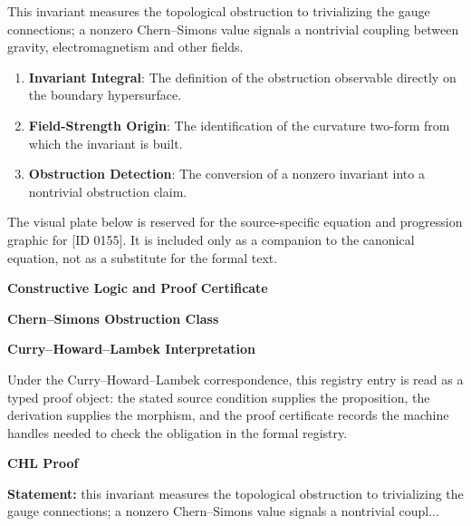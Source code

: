 This invariant measures the topological obstruction to trivializing the gauge connections; a nonzero Chern--Simons value signals a nontrivial coupling between gravity, electromagnetism and other fields.
\endgroup

\begin{enumerate}[leftmargin=1.6em,itemsep=6pt,topsep=4pt]
\item \textbf{Invariant Integral}: The definition of the obstruction observable directly on the boundary hypersurface.
\item \textbf{Field-Strength Origin}: The identification of the curvature two-form from which the invariant is built.
\item \textbf{Obstruction Detection}: The conversion of a nonzero invariant into a nontrivial obstruction claim.
\end{enumerate}

\begingroup\footnotesize\sloppy
The visual plate below is reserved for the source-specific equation and progression graphic for [ID 0155]. It is included only as a companion to the canonical equation, not as a substitute for the formal text.
\par\endgroup
\ifTZPDarkEdition
{}
\fi

\clearpage
\begingroup\tzpsupportsetup
\noindent\textbf{\fontsize{10.8pt}{12.8pt}\selectfont [ID 0155] Constructive Logic and Proof Certificate}\par
\noindent\textbf{\fontsize{10pt}{12pt}\selectfont Chern--Simons Obstruction Class}\par
\vspace{0.45em}
\begingroup
\footnotesize
\setlength{\parskip}{0.22em}
\setlength{\parindent}{0pt}
\noindent\textbf{Curry--Howard--Lambek Interpretation}\par
Under the Curry--Howard--Lambek correspondence, this registry entry is read as a typed proof
object: the stated source condition supplies the proposition, the derivation supplies the
morphism, and the proof certificate records the machine handles needed to check the obligation
in the formal registry.

\vspace{0.45em}
\noindent\textbf{CHL Proof}\par
\textbf{Statement:} this invariant measures the topological obstruction to trivializing the gauge
connections; a nonzero Chern--Simons value signals a nontrivial coupl...


